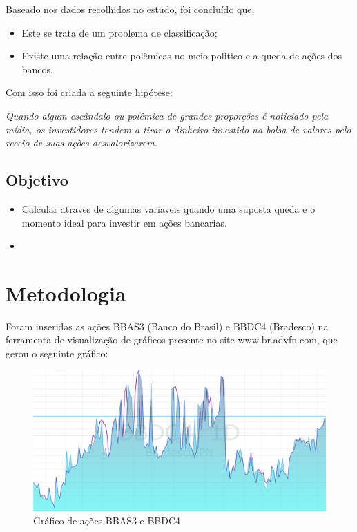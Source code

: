 \documentclass{sigchi}
\begin{document}
 Baseado nos dados recolhidos no estudo, foi concluído que: 
 \begin{itemize}
 
 \item{Este se trata de um problema de classificação;}
 \item{Existe uma relação entre polêmicas no meio politico e a queda de ações dos bancos.}
 
 \end{itemize}
Com isso foi criada a seguinte hipótese: 

\textit{
Quando algum escândalo ou polêmica de grandes proporções é noticiado pela mídia, os investidores tendem a tirar o dinheiro investido na bolsa de valores pelo receio de suas ações desvalorizarem.
}

\subsection{Objetivo}

\begin{itemize}
	
	\item Calcular atraves de algumas variaveis quando uma suposta queda e o momento ideal para investir em ações bancarias.
	\item 
\end{itemize}


\section{Metodologia}
Foram inseridas as ações BBAS3 (Banco do Brasil) e BBDC4 (Bradesco) na ferramenta de visualização de gráficos presente no site www.br.advfn.com, que gerou o seguinte gráfico: 

 \begin{figure}[!htb]
\centering
\includegraphics[scale=0.27]{./figures/figura1.png}
\caption{Gráfico de ações BBAS3 e BBDC4}
\label{fig1}
\end{figure}
\end{document}
